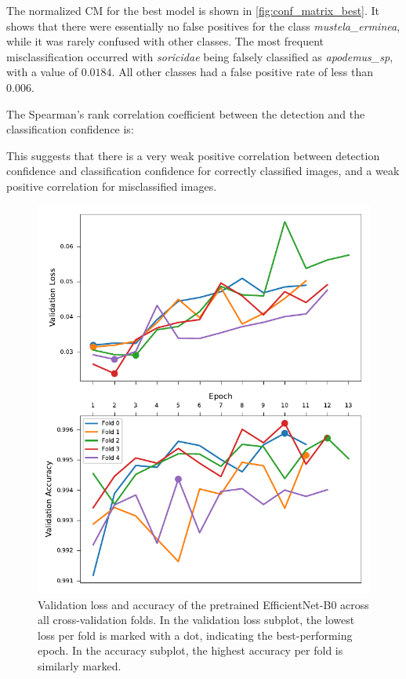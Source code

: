 The normalized \ac{CM} for the best model is shown in \autoref{fig:conf_matrix_best}.
It shows that there were essentially no false positives for the class \textit{mustela\_erminea}, while it was rarely confused with other classes.
The most frequent misclassification occurred with \textit{soricidae} being falsely classified as \textit{apodemus\_sp}, with a value of \(0.0184\).
All other classes had a false positive rate of less than \(0.006\).

The Spearman's rank correlation coefficient between the detection and the classification confidence is:



This suggests that there is a very weak positive correlation between detection confidence and classification confidence for correctly classified images, and a weak positive correlation for misclassified images.

\begin{figure}[ht]
\centering
\includegraphics{figures/training_metrics_best_model.pdf}
\caption{
    Validation loss and accuracy of the pretrained EfficientNet-B0 across all cross-validation folds. 
    In the validation loss subplot, the lowest loss per fold is marked with a dot, indicating the best-performing epoch. 
    In the accuracy subplot, the highest accuracy per fold is similarly marked.
    }
\label{fig:training_metrics_best_model}
\end{figure}

